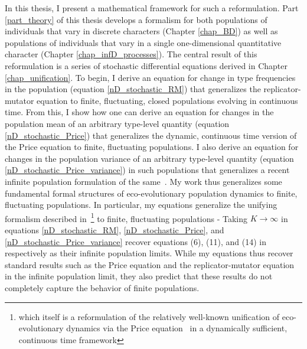 In this thesis, I present a mathematical framework for such a reformulation. Part \ref{part_theory} of this thesis develops a formalism for both populations of individuals that vary in discrete characters (Chapter \ref{chap_BD}) as well as populations of individuals that vary in a single one-dimensional quantitative character (Chapter \ref{chap_infD_processes}). The central result of this reformulation is a series of stochastic differential equations derived in Chapter \ref{chap_unification}. To begin, I derive an equation for change in type frequencies in the population (equation \eqref{nD_stochastic_RM}) that generalizes the replicator-mutator equation to finite, fluctuating, closed populations evolving in continuous time. From this, I show how one can derive an equation for changes in the population mean of an arbitrary type-level quantity (equation \eqref{nD_stochastic_Price}) that generalizes the dynamic, continuous time version of the Price equation to finite, fluctuating populations. I also derive an equation for changes in the population variance of an arbitrary type-level quantity (equation \eqref{nD_stochastic_Price_variance}) in such populations that generalizes a recent infinite population formulation of the same~\citep{lion_theoretical_2018}. My work thus generalizes some fundamental formal structures of eco-evolutionary population dynamics to finite, fluctuating populations. In particular, my equations generalize the unifying formalism described in~\cite{lion_theoretical_2018}\footnote{which itself is a reformulation of the relatively well-known unification of eco-evolutionary dynamics via the Price equation~\citep{frank_natural_2012, queller_fundamental_2017, luque_mirror_2021} in a dynamically sufficient, continuous time framework} to finite, fluctuating populations - Taking $K \to \infty$ in equations \eqref{nD_stochastic_RM}, \eqref{nD_stochastic_Price}, and \eqref{nD_stochastic_Price_variance} recover equations (6), (11), and (14) in~\cite{lion_theoretical_2018} respectively as their infinite population limits. While my equations thus recover standard results such as the Price equation and the replicator-mutator equation in the infinite population limit, they also predict that these results do not completely capture the behavior of finite populations.

